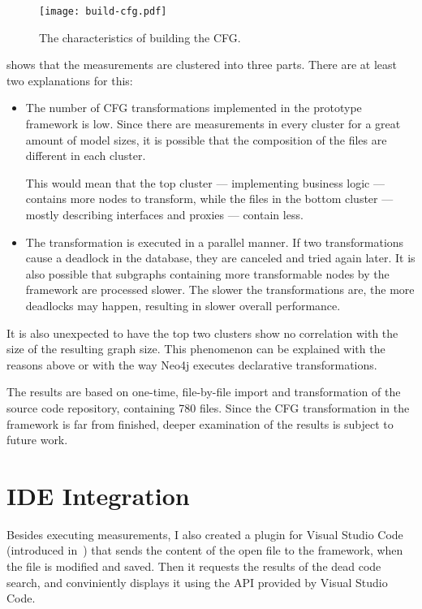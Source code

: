 \begin{figure}[!htb]
  \centering
  \texttt{[image: build-cfg.pdf]}
  \caption{The characteristics of building the CFG.}
  \label{fig:build-cfg}
\end{figure}

 shows that the measurements are clustered into three parts. There are at least two explanations for this:

\begin{itemize}[topsep=0pt]
  \item The number of CFG transformations implemented in the prototype framework is low. Since there are measurements in every cluster for a great amount of model sizes, it is possible that the composition of the files are different in each cluster.

  This would mean that the top cluster --- implementing business logic --- contains more nodes to transform, while the files in the bottom cluster --- mostly describing interfaces and proxies --- contain less.

  \item The transformation is executed in a parallel manner. If two transformations cause a deadlock in the database, they are canceled and tried again later. It is also possible that subgraphs containing more transformable nodes by the framework are processed slower. The slower the transformations are, the more deadlocks may happen, resulting in slower overall performance.
\end{itemize}

It is also unexpected to have the top two clusters show no correlation with the size of the resulting graph size. This phenomenon can be explained with the reasons above or with the way Neo4j executes declarative transformations.

The results are based on one-time, file-by-file import and transformation of the source code repository, containing 780 files. Since the CFG transformation in the framework is far from finished, deeper examination of the results is subject to future work.


\section{IDE Integration}
\label{sect:ide-integration}
Besides executing measurements, I also created a plugin for Visual Studio Code (introduced in~) that sends the content of the open file to the framework, when the file is modified and saved. Then it requests the results of the dead code search, and conviniently displays it using the API provided by Visual Studio Code.

